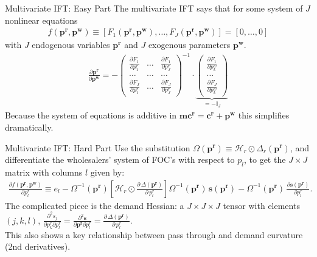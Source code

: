 \documentclass[aspectratio=169,11pt]{beamer}
\begin{document}
\begin{frame}{Multivariate IFT: Easy Part}
The multivariate IFT says that for some system of $J$ nonlinear equations 
\begin{align*}
f(\symbf{p^r},\symbf{p^w}) \equiv [F_1(\symbf{p^r},\symbf{p^w}), \ldots, F_J(\symbf{p^r},\symbf{p^w})]=[0,\ldots,0]
\end{align*}
with $J$ endogenous variables $\symbf{p^r}$ and $J$ exogenous parameters $\symbf{p^w}$.
\begin{align}
\label{eq:ptr_matrix}
\tag{PTR}
\frac{\partial \symbf{p^r}}{\partial \symbf{p^w}}
=-\left(\begin{array}{ccc}
\frac{\partial F_{1}}{\partial p_{1}^r} & \ldots & \frac{\partial F_{1}}{\partial p_{J}^r} \\
\ldots & \ldots & \ldots \\
\frac{\partial F_{J}}{\partial p_{1}^r} & \ldots & \frac{\partial F_{J}}{\partial p_{J}^r}
\end{array}\right)^{-1} \cdot \underbrace{\left(\begin{array}{l}
\frac{\partial F_{1}}{\partial p_{k}^w} \\
\ldots \\
\frac{\partial F_{J}}{\partial p_{k}^w}
\end{array}\right)}_{= -\mathbb{I}_J}
\end{align}
Because the system of equations is additive in $\symbf{mc^r} = \symbf{c^r} + \symbf{p^w}$ this simplifies dramatically.
\end{frame}


\begin{frame}{Multivariate IFT: Hard Part}
Use the substitution $\Omega(\symbf{p^r}) \equiv \mathcal{H}_r \odot \Delta_{r}(\symbf{p^r})$, and differentiate the wholesalers' system of FOC's with respect to $p_l$, to get the $J \times J$ matrix with columns $l$ given by:
\begin{align}
\frac{\partial f(\symbf{p^r},\symbf{p^w})}{\partial p_l^r} \equiv e_l - \Omega^{-1}(\symbf{p^r})
\left[  \mathcal{H}_{r} \odot \frac{\partial\, \Delta(\symbf{p^r})}{\partial\, p_l^r} \right]
\Omega^{-1}(\symbf{p^r})\,
\symbf{s}(\symbf{p^r}) -\Omega^{-1}(\symbf{p^r})\, \frac{\partial \symbf{s}(\symbf{p^r})}{\partial p_l^r}.
\end{align}
The complicated piece is the demand Hessian: a $J \times J \times J$ tensor with elements $(j,k,l)$, $\frac{\partial^2 s_j}{\partial p_k^r \partial p_l^r} = \frac{\partial^2 \symbf{s}}{\partial \symbf{p^r} \partial p_l^r}=\frac{\partial\, \Delta(\symbf{p^r})}{\partial\, p_l^r}$.\\

This also shows a key relationship between \alert{pass through} and \alert{demand curvature} (2nd derivatives).
\end{frame}
\end{document}
